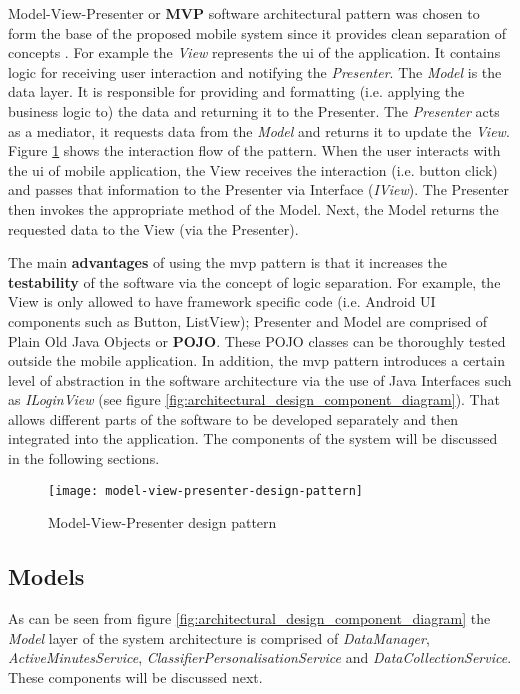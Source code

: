     Model-View-Presenter or \textbf{MVP} software architectural pattern was chosen to form the base of the proposed mobile system since it provides clean separation of concepts \citep[532]{zhang2010}. For example the \textit{View} represents the \gls{ui} of the application. It contains logic for receiving user interaction and notifying the \textit{Presenter}. The \textit{Model} is the data layer. It is responsible for providing and formatting (i.e. applying the business logic to) the data and returning it to the Presenter. The \textit{Presenter} acts as a mediator, it requests data from the \textit{Model} and returns it to update the \textit{View}. Figure \ref{fig:model_view_presenter_design_pattern} shows the interaction flow of the pattern. When the user interacts with the \gls{ui} of mobile application, the View receives the interaction (i.e. button click) and passes that information to the Presenter via Interface (\textit{IView}). The Presenter then invokes the appropriate method of the Model. Next, the Model returns the requested data to the View (via the Presenter). 
        
    The main \textbf{advantages} of using the \gls{mvp} pattern is that it increases the \textbf{testability} of the software via the concept of logic separation. For example, the View is only allowed to have framework specific code (i.e. Android UI components such as Button, ListView); Presenter and Model are comprised of Plain Old Java Objects or \textbf{POJO}. These POJO classes can be thoroughly tested outside the mobile application. In addition, the \gls{mvp} pattern introduces a certain level of abstraction in the software architecture via the use of Java Interfaces such as \textit{ILoginView} (see figure \ref{fig:architectural_design_component_diagram}). That allows different parts of the software to be developed separately and then integrated into the application. The components of the system will be discussed in the following sections.
    
    \begin{figure}[ht]
        \centering
        \texttt{[image: model-view-presenter-design-pattern]}
        \caption{Model-View-Presenter design pattern \citep[28]{syromiatnikov2014}}
        \label{fig:model_view_presenter_design_pattern}
    \end{figure}
        
        \subsection{Models}
        As can be seen from figure \ref{fig:architectural_design_component_diagram} the \textit{Model} layer of the system architecture is comprised of \textit{DataManager}, \textit{ActiveMinutesService}, \textit{ClassifierPersonalisationService} and \textit{DataCollectionService}. These components will be discussed next.
        
